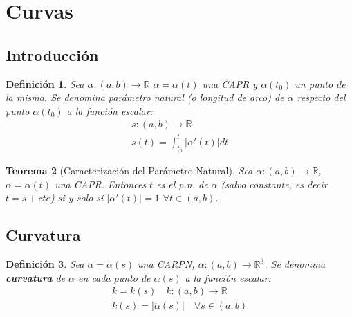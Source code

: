 \documentclass[twoside]{article}
\newtheorem{theorem}{Teorema}[section]
\newtheorem{defi}[theorem]{Definición}
\numberwithin{equation}{section}
\providecommand{\abs}[1]{\lvert#1\rvert}
\newcommand{\erre}{\mathbb{R}}
\begin{document}
\section{Curvas}
\subsection{Introducción}
\begin{defi}
Sea $\alpha:(a,b)\longrightarrow \erre$ $\alpha=\alpha(t)$ una CAPR y $\alpha(t_0)$ un punto de la misma. Se denomina parámetro natural (o longitud de arco) de $\alpha$ respecto del punto $\alpha(t_0)$ a la función escalar:
\begin{gather*}
s:(a,b)\longrightarrow \erre\\
s(t)=\int_{t_0}^t \abs{\alpha'(t)}dt
\end{gather*}
\end{defi}
\begin{theorem}[Caracterización del Parámetro Natural] Sea $\alpha:(a,b)\longrightarrow \erre$, $\alpha=\alpha(t)$ una CAPR. Entonces $t$ es el p.n. de $\alpha$ (salvo constante, es decir $t=s+cte$) si y solo sí $\abs{\alpha'(t)}=1$ $\forall t\in(a,b)$.
\end{theorem}
\subsection{Curvatura}
\begin{defi}
Sea $\alpha=\alpha(s)$ una CARPN, $\alpha:(a,b)\longrightarrow \erre^3$. Se denomina \textbf{curvatura} de $\alpha$ en cada punto de $\alpha(s)$ a la función escalar:
\begin{gather*}
k=k(s) \quad k:(a,b)\longrightarrow \erre\\
k(s)=\abs{\ddot{\alpha}(s)} \quad \forall s\in (a,b)
\end{gather*}
\end{defi}
\newpage
\end{document}
